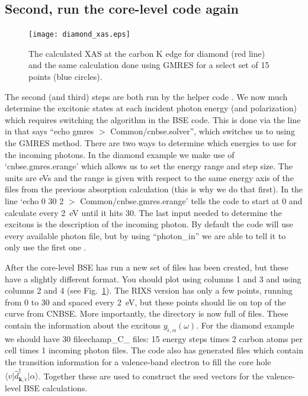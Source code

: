 \documentclass[11pt]{report}
\begin{document}
\subsection{Second, run the core-level code again}
\begin{figure}
\center
\texttt{[image: diamond\_xas.eps]}
\caption{ The calculated XAS at the carbon K edge for diamond (red line) and the same calculation done using GMRES for a select set of 15 points (blue circles). }
\label{diamond_xas_plot}
\end{figure}

The second (and third) steps are both run by the helper code . 
We now much determine the excitonic states at each incident photon energy (and polarization) which requires switching the algorithm in the BSE code. This is done via the line in  that says ``echo gmres $>$ Common/cnbse.solver'', which switches us to using the GMRES method. 
There are two ways to determine which energies to use for the incoming photons. 
In the diamond example we make use of `cnbse.gmres.erange' which allows us to set the energy range and step size. The units are eVs and the range is given with respect to the same energy axis of the  files from the previous absorption calculation (this is why we do that first).
In  the line `echo 0 30 2 $>$ Common/cnbse.gmres.erange' tells the code to start at 0 and calculate every 2~eV until it hits 30.
The last input needed to determine the excitons is the description of the incoming photon. By default the code will use every available photon file, but by using ``photon\_in'' we are able to tell it to only use the first one .

After the core-level BSE has run a new set of  files has been created, but these have a slightly different format. 
You should plot  using columns 1 and 3 and  using columns 2 and 4 (see Fig.~\ref{diamond_xas_plot}). 
The RIXS version has only a few points, running from 0 to 30 and spaced every 2~eV, but these points should lie on top of the curve from CNBSE.
More importantly, the  directory is now full of  files. These contain the information about the excitons $y_{\hat{\epsilon},\alpha}(\omega)$. 
For the diamond example we should have 30 file{echamp\_C\_} files: 15 energy steps times 2 carbon atoms per cell times 1 incoming photon files.
The code also has generated  files which contain the transition information for a valence-band electron to fill the core hole $\langle v \vert \hat{d}^\dagger_{\mathbf{k},\hat{\epsilon}} \vert \alpha \rangle $. 
Together these are used to construct the seed vectors for the valence-level BSE calculations.
\end{document}
